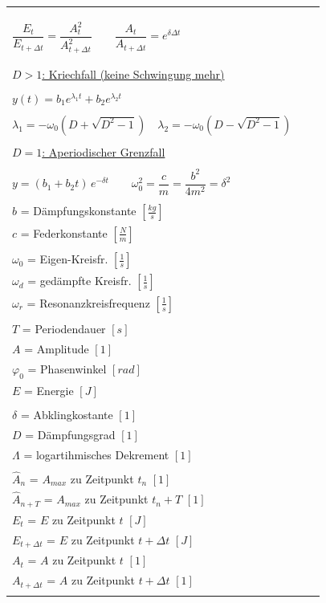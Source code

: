 \begin{tabular}{|p{4cm}|p{8cm}|p{6cm}|}
\begin{minipage}[]{8cm}
		$\Lambda=\delta T=\dfrac{2\pi D}{\sqrt{1-D^2}}=\ln{\dfrac{\hat
		A_n}{\hat A_{n+T}}}\qquad\dfrac{\hat A_n}{\hat A_{n+T}}=e^{\delta T}$\\ \\ \\
		$\dfrac{E_t}{E_{t+\Delta t}}=\dfrac{A_t^2}{A_{t+\Delta t}^2} \qquad
		\dfrac{A_t}{A_{t+\Delta t}}= e^{\delta \Delta t} $\\ \\ \\
		\underline{$D>1$: Kriechfall (keine Schwingung mehr)}\\ \\
		$y(t)=b_1 e^{\lambda_1 t}+b_2e^{\lambda_2 t}$\\ \\
		$\lambda_1=-\omega_0(D+\sqrt{D^2-1})\quad\lambda_2=-\omega_0(D-\sqrt{D^2-1})$\\ \\
		\underline{$D=1$: Aperiodischer Grenzfall}\\ \\
		$y=(b_1+b_2 t)\,e^{-\delta t} \qquad
		\omega_0^2=\dfrac{c}{m}=\dfrac{b^2}{4m^2}=\delta^2$\\
	\end{minipage} &
	\begin{minipage}[]{6cm}
 		$m$ = Masse $[kg]$\\
 		$b$ = Dämpfungskonstante $[\frac{kg}{s}]$\\
 		$c$ = Federkonstante $[\frac{N}{m}]$\\ \\
 		$\omega_0$ = Eigen-Kreisfr. $[\frac{1}{s}]$\\
 		$\omega_d$ = gedämpfte Kreisfr. $[\frac{1}{s}]$\\
 		$\omega_r$ = Resonanzkreisfrequenz $[\frac{1}{s}]$\\ \\ 				
 		$T$ = Periodendauer $[s]$\\
 		$A$ = Amplitude $[1]$\\
 		$\varphi_0$ = Phasenwinkel $[rad]$ \\ 		
 		$E$ = Energie $[J]$\\ \\
 		$\delta$ = Abklingkostante $[1]$\\
 		$D$ = Dämpfungsgrad $[1]$\\
 		$\Lambda$ = logartihmisches Dekrement $[1]$\\ \\
 		$\hat A_n$ = $A_{max}$ zu Zeitpunkt $t_n$ $[1]$\\
  		$\hat A_{n+T}$ = $A_{max}$ zu Zeitpunkt $t_n+T$ $[1]$\\
  		$E_t$ = $E$ zu Zeitpunkt $t$ $[J]$\\
  		$E_{t+\Delta t}$ = $E$ zu Zeitpunkt $t+\Delta t$ $[J]$\\
  		$A_t$ = $A$ zu Zeitpunkt $t$ $[1]$\\
  		$A_{t+\Delta t}$ = $A$ zu Zeitpunkt $t+\Delta t$ $[1]$\\				
 		

\end{minipage}
\end{tabular}
